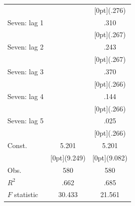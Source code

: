\documentclass[12pt,a4paper,titlepage]{article}
\begin{document}
{\begin{tabular*}{\textwidth}{@{\extracolsep{\fill}}lcc}
&	&	\raisebox{.7ex}[0pt]{\scriptsize (.276)} \\
Seven: lag 1 &	&	.310 \\
&	&	\raisebox{.7ex}[0pt]{\scriptsize (.267)} \\
Seven: lag 2 &	&	.243 \\
&	&	\raisebox{.7ex}[0pt]{\scriptsize (.267)} \\
Seven: lag 3 &	&	.370 \\
&	&	\raisebox{.7ex}[0pt]{\scriptsize (.266)} \\
Seven: lag 4 &	&	.144 \\
&	&	\raisebox{.7ex}[0pt]{\scriptsize (.266)} \\
Seven: lag 5 &	&	.025 \\
&	&	\raisebox{.7ex}[0pt]{\scriptsize (.266)} \\
Const. &	5.201 &	5.201 \\
&	\raisebox{.7ex}[0pt]{\scriptsize (9.249)} &	\raisebox{.7ex}[0pt]{\scriptsize (9.082)} \\
Obs. &	580 &	580 \\
$ R^2$ &	.662 &	.685 \\
$ F$ statistic &	30.433 &	21.561 \\
\hline\hline		
\end{tabular*}%


}
\end{document}
